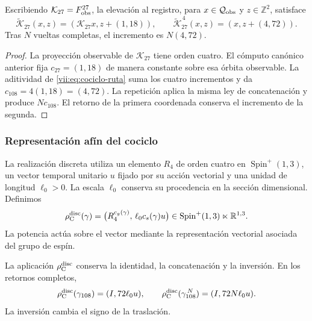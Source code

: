 \begin{proposition}
\label{vii:prop:memoria-vuelta-completa}
Escribiendo \(\mathcal K_{27}=F_{\rm obs}^{27}\), la elevación
al registro, para \(x\in\mathcal Q_{\rm obs}\) y \(z\in\mathbb Z^2\), satisface
\[
 \widetilde{\mathcal K}_{27}(x,z)
   =(\mathcal K_{27}x,z+(1,18)),\qquad
 \widetilde{\mathcal K}_{27}^{\,4}(x,z)
   =(x,z+(4,72)).
\]
Tras \(N\) vueltas completas, el incremento es \(N(4,72)\).
\end{proposition}

\begin{proof}
La proyección observable de \(\mathcal K_{27}\) tiene orden cuatro.
El cómputo canónico anterior fija \(c_{27}=(1,18)\) de manera constante
sobre esa órbita observable. La aditividad de
\eqref{vii:eq:cociclo-ruta} suma los cuatro incrementos y da
\(c_{108}=4(1,18)=(4,72)\).
La repetición aplica la misma ley de concatenación y produce
\(Nc_{108}\). El retorno de la primera coordenada conserva el
incremento de la segunda.
\end{proof}

\subsubsection{Representación afín del cociclo}
\label{vii:subsec:representacion-afin-cociclo}

La realización discreta utiliza un elemento \(R_4\) de orden cuatro en
\(\operatorname{Spin}^+(1,3)\), un vector temporal unitario \(u\)
fijado por su acción vectorial y una unidad de longitud \(\ell_0>0\).
La escala \(\ell_0\) conserva su procedencia en la sección dimensional.
Definimos
\begin{equation}
 \rho_{\rm C}^{\rm disc}(\gamma)=
 \bigl(R_4^{c_g(\gamma)},\,\ell_0c_s(\gamma)u\bigr)
 \in\operatorname{Spin}^+(1,3)\ltimes\mathbb R^{1,3}.
 \label{vii:eq:representacion-discreta-memoria}
\end{equation}
La potencia actúa sobre el vector mediante la representación vectorial
asociada del grupo de espín.

\begin{theorem}
\label{vii:thm:traslacion-memoria}
La aplicación \(\rho_{\rm C}^{\rm disc}\) conserva la identidad,
la concatenación y la inversión. En los retornos completos,
\begin{equation}
 \rho_{\rm C}^{\rm disc}(\gamma_{108})=(I,72\ell_0u),\qquad
 \rho_{\rm C}^{\rm disc}(\gamma_{108}^{\,N})=(I,72N\ell_0u).
 \label{vii:eq:traslacion-retorno-108}
\end{equation}
La inversión cambia el signo de la traslación.
\end{theorem}

